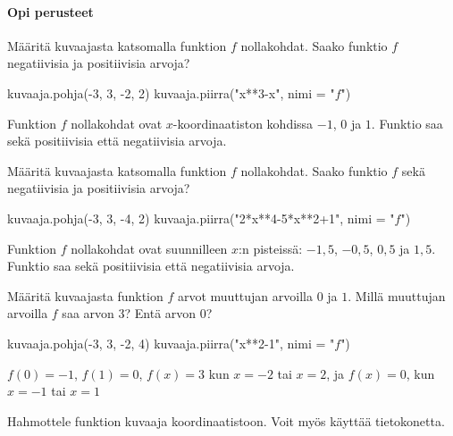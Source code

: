 \begin{tehtavasivu}


\paragraph*{Opi perusteet}
\begin{tehtava}
Määritä kuvaajasta katsomalla funktion \(f\) nollakohdat. Saako funktio \(f\) negatiivisia ja positiivisia arvoja?
\begin{kuva}
    kuvaaja.pohja(-3, 3, -2, 2)
    kuvaaja.piirra("x**3-x", nimi = "$f$")
\end{kuva}
\begin{vastaus}
Funktion $f$ nollakohdat ovat $x$-koordinaatiston kohdissa $-1$, $0$ ja $1$. Funktio saa sekä positiivisia että negatiivisia arvoja.
\end{vastaus}
\end{tehtava}

\begin{tehtava}
Määritä kuvaajasta katsomalla funktion $f$ nollakohdat. Saako funktio $f$ sekä negatiivisia ja positiivisia arvoja?
\begin{kuva}
    kuvaaja.pohja(-3, 3, -4, 2)
    kuvaaja.piirra("2*x**4-5*x**2+1", nimi = "$f$")
\end{kuva}
\begin{vastaus}
Funktion $f$ nollakohdat ovat suunnilleen $x$:n pisteissä: $-1,5$, $-0,5$, $0,5$ ja $1,5$. Funktio saa sekä positiivisia että negatiivisia arvoja.
\end{vastaus}
\end{tehtava}

\begin{tehtava}
Määritä kuvaajasta funktion $f$ arvot muuttujan arvoilla $0$ ja $1$. Millä muuttujan arvoilla $f$ saa arvon $3$? Entä arvon $0$?
\begin{kuva}
    kuvaaja.pohja(-3, 3, -2, 4)
    kuvaaja.piirra("x**2-1", nimi = "$f$")
\end{kuva}
\begin{vastaus}
 $f(0)=-1$, $f(1)=0$, $f(x)=3$ kun $x=-2$ tai $x=2$, ja $f(x)=0$, kun $x=-1$ tai $x=1$
\end{vastaus}
\end{tehtava}


\begin{tehtava}
Hahmottele funktion kuvaaja koordinaatistoon. Voit myös käyttää tietokonetta.
\begin{alakohdat}
\end{alakohdat}


\end{tehtava}
\end{tehtavasivu}
